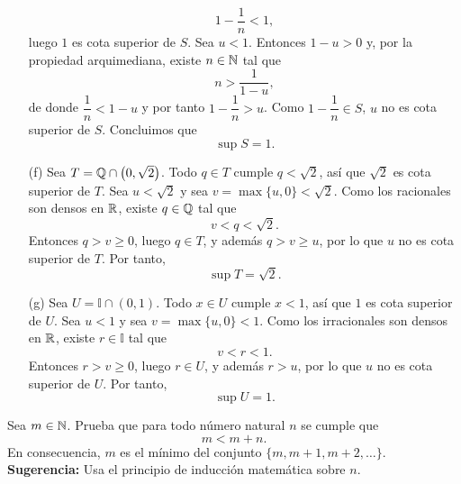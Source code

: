 \documentclass[12pt,a4paper]{article}
\begin{document}
\begin{solucion}
\begin{enumerate}
            \begin{equation*}
                1-\frac{1}{n}\lt1,
            \end{equation*}
            luego $1$ es cota superior de $S$. Sea $u\lt1$. Entonces $1-u\gt0$ y, por la propiedad arquimediana, existe $n\in\N$ tal que
            \begin{equation*}
                n\gt\frac{1}{1-u},
            \end{equation*}
            de donde $\dfrac{1}{n}\lt1-u$ y por tanto $1-\dfrac{1}{n}\gt u$. Como $1-\dfrac{1}{n}\in S$, $u$ no es cota superior de $S$. Concluimos que
            \begin{equation*}
                \sup S=1.
            \end{equation*}
            \item[(f)] Sea $T=\mathbb{Q}\cap\left(0,\sqrt{2}\right)$. Todo $q\in T$ cumple $q\lt\sqrt{2}$, así que $\sqrt{2}$ es cota superior de $T$. Sea $u\lt\sqrt{2}$ y sea $v=\max\{u,0\}\lt\sqrt{2}$. Como los racionales son densos en $\mathbb{R}$, existe $q\in\mathbb{Q}$ tal que
            \begin{equation*}
                v\lt q\lt\sqrt{2}.
            \end{equation*}
            Entonces $q\gt v\geq0$, luego $q\in T$, y además $q\gt v\geq u$, por lo que $u$ no es cota superior de $T$. Por tanto,
            \begin{equation*}
                \sup T=\sqrt{2}.
            \end{equation*}
            \item[(g)] Sea $U=\mathbb{I}\cap(0,1)$. Todo $x\in U$ cumple $x\lt1$, así que $1$ es cota superior de $U$. Sea $u\lt1$ y sea $v=\max\{u,0\}\lt1$. Como los irracionales son densos en $\mathbb{R}$, existe $r\in\mathbb{I}$ tal que
            \begin{equation*}
                v\lt r\lt1.
            \end{equation*}
            Entonces $r\gt v\geq0$, luego $r\in U$, y además $r\gt u$, por lo que $u$ no es cota superior de $U$. Por tanto,
            \begin{equation*}
                \sup U=1.
            \end{equation*}
        \end{enumerate}
    \end{solucion}

    \begin{problema}
        Sea $m\in\mathbb{N}$. Prueba que para todo número natural $n$ se cumple que
        \begin{equation*}
            m\lt m+n.
        \end{equation*}
        En consecuencia, $m$ es el mínimo del conjunto $\{m,m+1,m+2,\dots\}$.\\
        \textbf{Sugerencia:} Usa el principio de inducción matemática sobre $n$.
    \end{problema}
\end{document}
